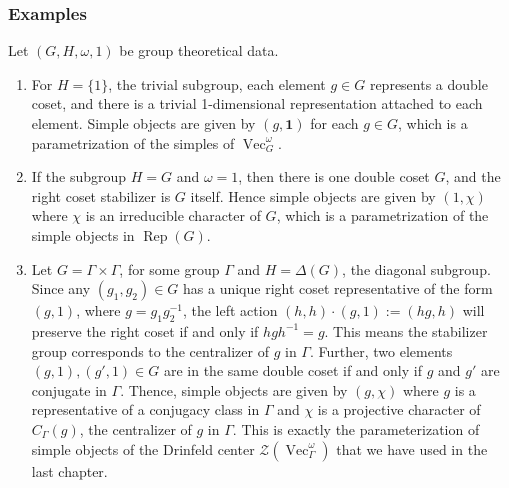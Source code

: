 \documentclass[a4paper, 10pt]{book}
\theoremstyle{definition}
\numberwithin{equation}{chapter}
\newcommand\inv{^{-1}}
\newcommand\Rep{\operatorname{Rep}}
\newcommand\Vect{\operatorname{Vec}}
\newcommand\CTR{\mathcal Z}
\newcommand\one{\mathbf{1}}
\begin{document}
\subsubsection{Examples}\label{examples} Let $(G, H, \omega, 1)$ be group theoretical data.
\begin{enumerate}
	\item For $H=\{1\}$, the trivial subgroup, each element $g\in G$ represents a double coset, and there is a trivial 1-dimensional representation attached to each element. Simple objects are given by $(g, \one)$ for each $g\in G$, which is a parametrization of the simples of $\Vect^\omega_G$.
	\item  If the subgroup $H =G$ and $\omega=1$, then there is one double coset $G$, and the right coset stabilizer is $G$ itself. Hence simple objects are given by $(1, \chi)$ where $\chi$ is an irreducible character of $G$, which is a parametrization of the simple objects in $\Rep (G)$.
	\item\label{groupdouble} Let $G= \Gamma \times \Gamma$, for some group $\Gamma$ and $H = \Delta(G)$, the diagonal subgroup. Since any $(g_1, g_2)\in G$ has a unique right coset representative of the form $(g,1)$, where $g=g_1g_2\inv$,  the left action $(h,h) \cdot (g, 1) := (hg, h)$ will preserve the right coset if and only if $hgh\inv =g$. This means the stabilizer group corresponds to the centralizer of $g$ in $\Gamma$. Further, two elements $(g,1), (g',1) \in G$ are in the same double coset if and only if $g$ and $g'$ are conjugate in $\Gamma$. Thence, simple objects are given by $(g, \chi)$ where $g$ is a representative of a conjugacy class in $\Gamma$ and $\chi$ is a projective character of $C_\Gamma(g)$, the centralizer of $g$ in $\Gamma$. This is exactly the parameterization of  simple objects of the Drinfeld center $\CTR(\Vect^\omega_\Gamma)$ that we have used in the last chapter. 
\end{enumerate}
\end{document}
